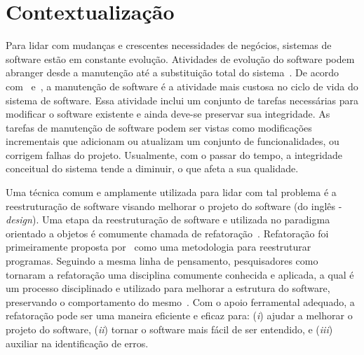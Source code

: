 
\section{Contextualização}\label{sec:contexto}


Para lidar com mudanças e crescentes necessidades de negócios, sistemas de software estão em constante evolução.
Atividades de evolução do software podem abranger desde a manutenção até a substituição total do sistema~\cite{seacord_2003}. 
De acordo com~ e~, a manutenção de software é a atividade mais custosa no ciclo de vida do sistema de software. 
Essa atividade inclui um conjunto de tarefas necessárias para modificar o software existente e ainda deve-se preservar sua integridade.
As tarefas de manutenção de software podem ser vistas como modificações incrementais que adicionam ou atualizam um conjunto de funcionalidades, ou corrigem falhas do projeto.
Usualmente, com o passar do tempo, a integridade conceitual do sistema tende a diminuir, o que afeta a sua qualidade.

Uma técnica comum e amplamente utilizada para lidar com tal problema é a reestruturação de software visando melhorar o projeto do software (do inglês - \emph{design}). Uma etapa da reestruturação de software e utilizada no paradigma orientado a objetos é comumente chamada de refatoração~\cite{OPDYKE_1992, Fowler1999, Mens04}. Refatoração foi primeiramente proposta por~ como uma metodologia para reestruturar programas. Seguindo a mesma linha de pensamento, pesquisadores como  tornaram a refatoração uma disciplina comumente conhecida e aplicada, a qual é um processo disciplinado e utilizado para melhorar a estrutura do software, preservando o comportamento do mesmo~\cite{Fowler1999}. Com o apoio ferramental adequado, a refatoração pode ser uma maneira eficiente e eficaz para: (\textit{i}) ajudar a melhorar o projeto do software, (\textit{ii}) tornar o software mais fácil de ser entendido, e (\textit{iii}) auxiliar na identificação de erros. %


